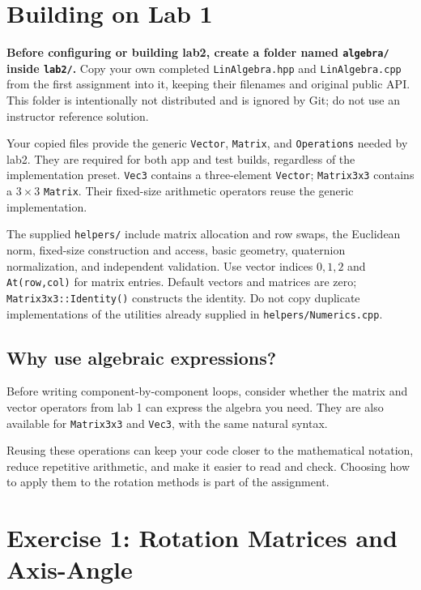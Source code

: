 \documentclass[11pt,a4paper]{article}
\begin{document}
\section*{Building on Lab 1}

\textbf{Before configuring or building lab2, create a folder named
\texttt{algebra/} inside \texttt{lab2/}.} Copy your own completed
\texttt{LinAlgebra.hpp} and \texttt{LinAlgebra.cpp} from the first assignment
into it, keeping their filenames and original public API. This folder is
intentionally not distributed and is ignored by Git; do not use an instructor
reference solution.

Your copied files provide the generic \texttt{Vector}, \texttt{Matrix}, and
\texttt{Operations} needed by lab2. They are required for both app and test
builds, regardless of the implementation preset.
\texttt{Vec3} contains a three-element \texttt{Vector}; \texttt{Matrix3x3}
contains a $3\times3$ \texttt{Matrix}. Their fixed-size arithmetic operators
reuse the generic implementation.

The supplied \texttt{helpers/} include matrix allocation and row swaps, the
Euclidean norm, fixed-size construction and access, basic geometry, quaternion
normalization, and independent validation. Use vector indices $0,1,2$ and
\texttt{At(row,col)} for matrix entries. Default vectors and matrices are zero;
\texttt{Matrix3x3::Identity()} constructs the identity.
Do not copy duplicate implementations of the utilities already supplied in
\texttt{helpers/Numerics.cpp}.

\subsection*{Why use algebraic expressions?}

Before writing component-by-component loops, consider whether the matrix and
vector operators from lab 1 can express the algebra you need. They are also
available for \texttt{Matrix3x3} and \texttt{Vec3}, with the same natural syntax.

Reusing these operations can keep your code closer to the mathematical notation,
reduce repetitive arithmetic, and make it easier to read and check. Choosing how
to apply them to the rotation methods is part of the assignment.

\section*{Exercise 1: Rotation Matrices and Axis-Angle}
\end{document}
